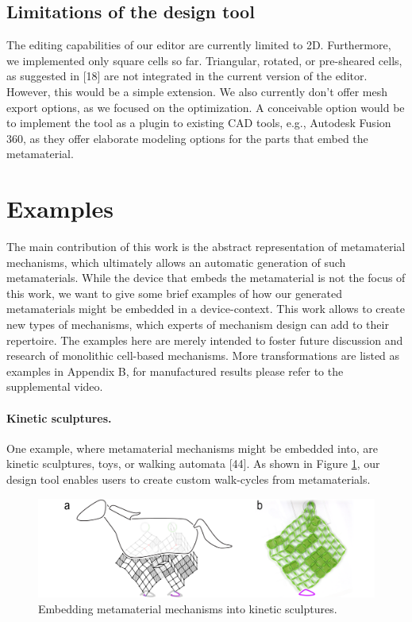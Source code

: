 \subsection{Limitations of the design tool}

The editing capabilities of our editor are currently limited to 2D. Furthermore, we implemented only square cells so far. Triangular, rotated, or pre-sheared cells, as suggested in [18] are not integrated in the current version of the editor. However, this would be a simple extension.  We also currently don’t offer mesh export options, as we focused on the optimization. A conceivable option would be to implement the tool as a plugin to existing CAD tools, e.g., Autodesk Fusion 360, as they offer elaborate modeling options for the parts that embed the metamaterial.


\section{Examples}

The main contribution of this work is the abstract representation of metamaterial mechanisms, which ultimately allows an automatic generation of such metamaterials. While the device that embeds the metamaterial is not the focus of this work, we want to give some brief examples of how our generated metamaterials might be embedded in a device-context. This work allows to create new types of mechanisms, which experts of mechanism design can add to their repertoire. The examples here are merely intended to foster future discussion and research of monolithic cell-based mechanisms. More transformations are listed as examples in Appendix B, for manufactured results please refer to the supplemental video.

\paragraph{Kinetic sculptures.} One example, where metamaterial mechanisms might be embedded into, are kinetic sculptures, toys, or walking automata [44]. As shown in Figure \ref{fig:16-examples-01-walker}, our design tool enables users to create custom walk-cycles from metamaterials. 

\begin{figure} [h]
    \includegraphics[width=\textwidth]{chapters/understanding-metamaterial-mechanisms-FIG/16-examples-01-walker.png}
    \caption[Short figure name.]{Embedding metamaterial mechanisms into kinetic sculptures. 
    \label{fig:16-examples-01-walker}}
\end{figure}

